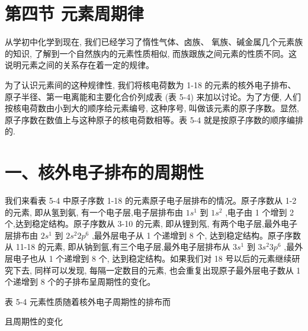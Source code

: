 \documentclass[10pt]{article}
\begin{document}
\section*{第四节 元素周期律}

从学初中化学到现在, 我们已经学习了惰性气体、卤族、 氧族、碱金属几个元素族的知识, 了解到一个自然族内的元素性质相似, 而族跟族之间元素的性质不同。这说明元素之间的关系存在着一定的规律。

为了认识元素间的这种规律性, 我们将核电荷数为 1-18 的元素的核外电子排布、原子半径、第一电离能和主要化合价列成表 (表 5-4) 来加以讨论。为了方便, 人们按核电荷数由小到大的顺序给元素编号, 这种序号, 叫做该元素的原子序数。显然, 原子序数在数值上与这种原子的核电荷数相等。表 5-4 就是按原子序数的顺序编排的.

\section*{一、核外电子排布的周期性}

我们来看表 5-4 中原子序数 1-18 的元素原子电子层排布的情况。原子序数从 1-2 的元素, 即从氢到氨, 有一个电子层,电子层排布由 \(1{s}^{1}\) 到 \(1{s}^{2}\) ,电子由 1 个增到 2 个,达到稳定结构。原子序数从 3-10 的元素, 即从锂到氖, 有两个电子层,最外电子层排布由 \(2{s}^{1}\) 到 \(2{s}^{2}2{p}^{6}\) ,最外层电子从 1 个递增到 8 个, 达到稳定结构。原子序数从 11-18 的元素, 即从钠到氩,有三个电子层,最外电子层排布从 \(3{s}^{1}\) 到 \(3{s}^{2}3{p}^{6}\) ,最外层电子也从 1 个递增到 8 个, 达到稳定结构。如果我们对 18 号以后的元素继续研究下去, 同样可以发现, 每隔一定数目的元素, 也会重复出现原子最外层电子数从 1 个递增到 8 个的子排布呈周期性的变化。

表 5-4 元素性质随着核外电子周期性的排布而

且周期性的变化
\end{document}
